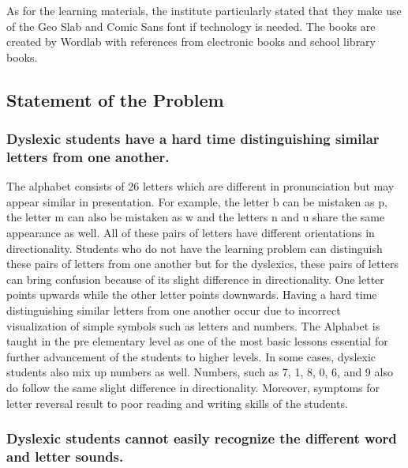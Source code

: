 \documentclass[letterpaper, 12pt, oneside]{book}
\begin{document}
As for the learning materials, the institute particularly stated that they make use of the Geo Slab and Comic Sans font if technology is needed. The books are created by Wordlab with references from electronic books and school library books.

\subsection{Statement of the Problem}

\subsubsection{Dyslexic students have a hard time distinguishing similar letters from one another.}

	The alphabet consists of 26 letters which are different in pronunciation but may appear similar in presentation. For example, the letter b can be mistaken as p, the letter m can also be mistaken as w and the letters n and u share the same appearance as well. All of these pairs of letters have different orientations in directionality. Students who do not have the learning problem can distinguish these pairs of letters from one another but for the dyslexics, these pairs of letters can bring confusion because of its slight difference in directionality. One letter points upwards while the other letter points downwards. Having a hard time distinguishing similar letters from one another occur due to incorrect visualization of simple symbols such as letters and numbers. The Alphabet is taught in the pre elementary level as one of the most basic lessons essential for further advancement of the students to higher levels. In some cases, dyslexic students also mix up numbers as well. Numbers, such as 7, 1, 8, 0, 6, and 9 also do follow the same slight difference in directionality. Moreover, symptoms for letter reversal result to poor reading and writing skills of the students.

\subsubsection{Dyslexic students cannot easily recognize the different word and letter sounds.}
\end{document}
